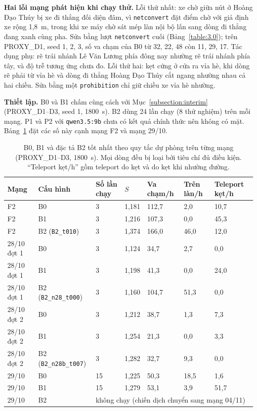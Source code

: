 \documentclass[../main.tex]{subfiles}
\begin{document}
\textbf{Hai lỗi mạng phát hiện khi chạy thử.} Lỗi thứ nhất: xe chờ giữa nút ở Hoàng Đạo Thúy bị xe đi thẳng đối diện đâm, vì \texttt{netconvert} đặt điểm chờ với giả định xe rộng 1,8~m, trong khi xe máy chờ sát mép làn nội bộ lấn sang dòng đi thẳng đang xanh cùng pha. Sửa bằng lượt \texttt{netconvert} cuối (Bảng~\ref{table:3.0}); trên PROXY\_D1, seed 1, 2, 3, số va chạm của B0 từ 32, 22, 48 còn 11, 29, 17. Tác dụng phụ: rẽ trái nhánh Lê Văn Lương phía đông nay nhường rẽ trái nhánh phía tây, và độ trễ tương ứng chưa đo. Lỗi thứ hai: kẹt cứng ở cửa ra vỉa hè, khi dòng rẽ phải từ vỉa hè và dòng đi thẳng Hoàng Đạo Thúy cắt ngang nhường nhau cả hai chiều. Sửa bằng một \texttt{prohibition} chỉ giữ chiều xe vỉa hè nhường.

\textbf{Thiết lập.} B0 và B1 chấm cùng cách với Mục~\ref{subsection:interim} (PROXY\_D1--D3, seed 1, 1800~s). B2 dùng 24 lần chạy (8 thử nghiệm) trên mỗi mạng. P1 và P2 với \texttt{qwen3.5:9b} chưa có kết quả chính thức nên không có mặt. Bảng~\ref{table:4.nets_results} đặt các số này cạnh mạng F2 và mạng 29/10.

\begin{table}[H]
\centering
\small
\setlength{\tabcolsep}{3pt}
\caption{B0, B1 và đặc tả B2 tốt nhất theo quy tắc dự phòng trên từng mạng (PROXY\_D1--D3, 1800~s). Mọi dòng đều bị loại bởi tiêu chí đủ điều kiện. ``Teleport kẹt/h'' gồm teleport do kẹt và do kẹt khi nhường đường.} \label{table:4.nets_results}
\begin{tabular}{|p{2.2cm}|p{3.5cm}|p{1.1cm}|p{1.1cm}|p{1.6cm}|p{1.6cm}|p{1.6cm}|}
\hline
\textbf{Mạng} & \textbf{Cấu hình} & \textbf{Số lần chạy} & \textbf{$S$} & \textbf{Va chạm/h} & \textbf{Trên làn/h} & \textbf{Teleport kẹt/h} \\ \hline
F2 & B0 & 3 & 1,181 & 112,7 & 2,0 & 10,7 \\ \hline
F2 & B1 & 3 & 1,216 & 107,3 & 0,0 & 45,3 \\ \hline
F2 & B2 (\texttt{B2\_t010}) & 3 & 1,374 & 166,0 & 46,0 & 12,0 \\ \hline
28/10 đợt 1 & B0 & 3 & 1,124 & 34,7 & 2,7 & 0,0 \\ \hline
28/10 đợt 1 & B1 & 3 & 1,198 & 41,3 & 0,0 & 24,0 \\ \hline
28/10 đợt 1 & B2 (\texttt{B2\_n28\_t000}) & 3 & 1,160 & 104,7 & 51,3 & 0,0 \\ \hline
28/10 đợt 2 & B0 & 3 & 1,212 & 38,7 & 1,3 & 7,3 \\ \hline
28/10 đợt 2 & B1 & 3 & 1,254 & 21,3 & 0,0 & 3,3 \\ \hline
28/10 đợt 2 & B2 (\texttt{B2\_n28b\_t007}) & 3 & 1,282 & 32,7 & 9,3 & 0,0 \\ \hline
29/10 & B0 & 15 & 1,225 & 50,3 & 18,5 & 1,6 \\ \hline
29/10 & B1 & 15 & 1,279 & 53,1 & 3,9 & 51,7 \\ \hline
29/10 & B2 & \multicolumn{5}{l|}{không chạy (chiến dịch chuyển sang mạng 04/11)} \\ \hline
\end{tabular}
\end{table}
\end{document}
